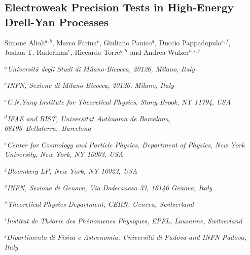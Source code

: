 \documentclass[../report.tex]{subfiles}
\providecommand{\main}{..}
\begin{document}
\subsection{Electroweak Precision Tests  in High-Energy Drell-Yan Processes} \label{DY}
\begin{center}
{Simone Alioli$^{a,b}$, Marco Farina$^{c}$,  Giuliano Panico$^{d}$,  Duccio Pappadopulo$^{e,f}$,\\
  Joshua T. Ruderman$^e$, Riccardo Torre$^{g,h}$  and Andrea Wulzer$^{h,i,j}$}
\centerline{$^a${\it Universit\'a degli Studi di Milano-Bicocca,
20126, Milano, Italy}}
\centerline{$^b${\it INFN, Sezione di Milano-Bicocca,
20126, Milano, Italy}}
\centerline{$^c${\it C.N.Yang Institute for Theoretical Physics, Stony Brook, NY 11794, USA}}
\centerline{$^d${\it \small IFAE and BIST, Universitat Aut\`onoma de Barcelona, 08193~Bellaterra,~Barcelona}}
\centerline{$^e${\it \small Center for Cosmology and Particle Physics, Department of Physics,
New York University, New York, NY 10003, USA}}
\centerline{$^f${\it\small Bloomberg LP, New York, NY 10022, USA}}
\centerline{$^g${\it \small INFN, Sezione di Genova, Via Dodecaneso 33, 16146 Genova, Italy}}
\centerline{$^h${\it\small Theoretical Physics Department, CERN, Geneva, Switzerland}}
\centerline{$^i${\it \small Institut de Th\'eorie des Ph\'enomenes Physiques, EPFL, Lausanne, Switzerland}}
\centerline{$^j${\it \small Dipartimento di Fisica e Astronomia, Universit\'a di Padova and INFN Padova, Italy}}
\end{center}



 

\end{document}
